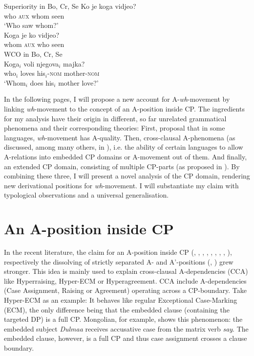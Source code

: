 \documentclass[output=paper,colorlinks,citecolor=brown]{langscibook}
\begin{document}
\ea\label{lohninger1bcssup}
  {Superiority} in {Bo, Cr, Se} \citep[30]{richards1997}
  \ea
    \gll Ko je koga vidjeo?\\
    who \textsc{aux} whom seen\\
    \glt `Who saw whom?'\\
  \ex
    \gll Koga je ko vidjeo?\\
    whom \textsc{aux} who seen\\
  \z
\ex\label{lohninger1bcswco}
  WCO in {Bo, Cr, Se} \citep[33]{richards1997}\\
  \gll Koga$_{i}$ voli njegova$_{i}$ majka?\\
  who$_{i}$ loves his$_{i}$-\textsc{nom} mother-\textsc{nom}\\
  \glt `Whom$_{i}$ does his$_{i}$ mother love?'\\
\z

In the following pages, I will propose a new account for A-\textit{wh}-movement by linking \textit{wh}-movement to the concept of an A-position inside CP. The ingredients for my analysis have their origin in different, so far unrelated grammatical phenomena and their corresponding theories: First,  proposal that in some languages, \textit{wh}-movement has A-quality. Then, cross-clausal A-phenomena (as discussed, among many others, in \citealp{wurmbrand2018cross}), i.e. the ability of certain languages to allow A-relations into embedded CP domains or A-movement out of them. And finally, an extended CP domain, consisting of multiple CP-parts (as proposed in \citealp{rizzi1997fine}). By combining these three, I will present a novel analysis of the CP domain, rendering new derivational positions for \textit{wh}-movement. I will substantiate my claim with typological observations and a universal generalisation.

\section{An A-position inside CP}
In the recent literature, the claim for an A-position inside CP (\citealp{tanaka2002raising}, \citealp{csener2008non}, \citealp{takeuchi2010exceptional}, \citealp{alboiu2011case}, \citealp{bondarenko2017ecm}, \citealp{zyman2017p}, \citealp{zyman2018rich}, \citealp{wurmbrand2018cross},  \citealp{fong2019proper}), respectively the dissolving of strictly separated A- and A'-positions (\citealp{obata2011feature}, \citealp{vanUrk2015}) grew stronger. This idea is mainly used to explain cross-clausal A-dependencies (CCA) like Hyperraising, Hyper-ECM or Hyperagreement. CCA include A-dependencies (Case Assignment, Raising or Agreement) operating across a CP-boundary. Take Hyper-ECM as an example: It behaves like regular Exceptional Case-Marking (ECM), the only difference being that the embedded clause (containing the targeted DP) is a full CP. Mongolian, for example, shows this phenomenon: the embedded subject \emph{Dulmaa} receives accusative case from the matrix verb \emph{say}. The embedded clause, however, is a full CP and thus case assignment crosses a clause boundary.
\end{document}
